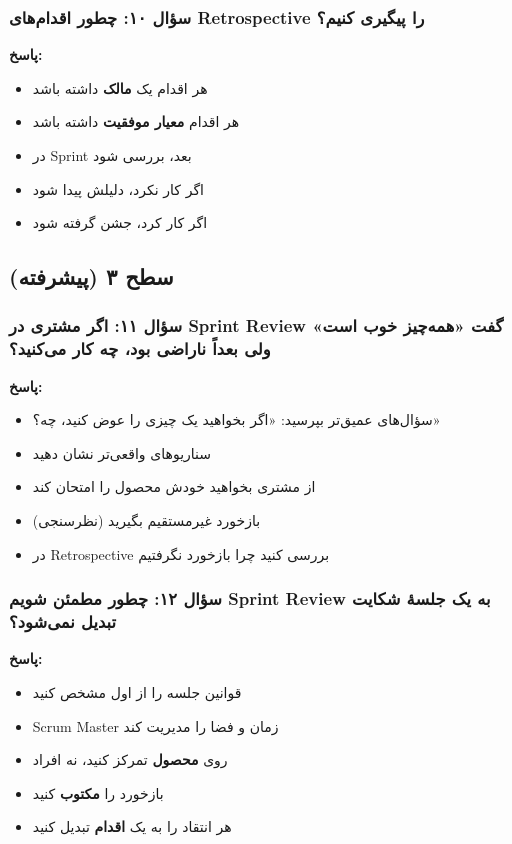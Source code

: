 \documentclass[12pt, a4paper]{article}
\begin{document}
\subsubsection{سؤال ۱۰: چطور اقدام‌های Retrospective را پیگیری کنیم؟}
\textbf{پاسخ:}
\begin{itemize}
    \item هر اقدام یک \textbf{مالک} داشته باشد
    \item هر اقدام \textbf{معیار موفقیت} داشته باشد
    \item در Sprint بعد، بررسی شود
    \item اگر کار نکرد، دلیلش پیدا شود
    \item اگر کار کرد، جشن گرفته شود
\end{itemize}

\subsection{سطح ۳ (پیشرفته)}

\subsubsection{سؤال ۱۱: اگر مشتری در Sprint Review گفت «همه‌چیز خوب است» 
ولی بعداً ناراضی بود، چه کار می‌کنید؟}
\textbf{پاسخ:}
\begin{itemize}
    \item سؤال‌های عمیق‌تر بپرسید: «اگر بخواهید یک چیزی را عوض کنید، چه؟»
    \item سناریوهای واقعی‌تر نشان دهید
    \item از مشتری بخواهید خودش محصول را امتحان کند
    \item بازخورد غیرمستقیم بگیرید (نظرسنجی)
    \item در Retrospective بررسی کنید چرا بازخورد نگرفتیم
\end{itemize}

\subsubsection{سؤال ۱۲: چطور مطمئن شویم Sprint Review به یک جلسهٔ شکایت 
تبدیل نمی‌شود؟}
\textbf{پاسخ:}
\begin{itemize}
    \item قوانین جلسه را از اول مشخص کنید
    \item Scrum Master زمان و فضا را مدیریت کند
    \item روی \textbf{محصول} تمرکز کنید، نه افراد
    \item بازخورد را \textbf{مکتوب} کنید
    \item هر انتقاد را به یک \textbf{اقدام} تبدیل کنید
\end{itemize}
\end{document}
